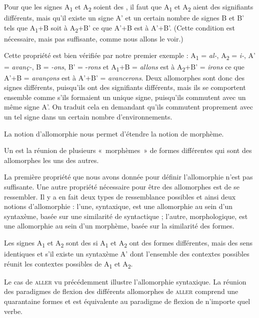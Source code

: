 {Pour que les signes A\textsubscript{1} et A\textsubscript{2} soient des , il faut que A\textsubscript{1} et A\textsubscript{2} aient des signifiants différents, mais qu’il existe un signe A’ et un certain nombre de signes B et B’ tels que A\textsubscript{1}+B soit à A\textsubscript{2}+B’ ce que A’+B est à A’+B’. (Cette condition est nécessaire, mais pas suffisante, comme nous allons le voir.)}

Cette propriété est bien vérifiée par notre premier exemple : A\textsubscript{1} = \textit{al-}, A\textsubscript{2} = \textit{i-}, A’ = \textit{avanç-}, B = \textit{{}-ons}, B’ = -\textit{rons} et A\textsubscript{1}+B = \textit{allons} est à A\textsubscript{2}+B’ = \textit{irons} ce que A’+B = \textit{avançons} est à A’+B’ = \textit{avancerons}. Deux allomorphes sont donc des signes différents, puisqu’ils ont des signifiants différents, mais ils se comportent ensemble comme s’ils formaient un unique signe, puisqu’ils commutent avec un même signe A’. On traduit cela en demandant qu’ils commutent proprement avec un tel signe dans un certain nombre d’environnements.

La notion d’allomorphie nous permet d’étendre la notion de morphème.

{Un  est la réunion de plusieurs «~morphèmes~» de formes différentes qui sont des allomorphes les uns des autres.}

La première propriété que nous avons donnée pour définir l’allomorphie n’est pas suffisante. Une autre propriété nécessaire pour être des allomorphes est de se ressembler. Il y a en fait deux types de ressemblance possibles et ainsi deux notions d’allomorphie : l’une, syntaxique, est une allomorphie au sein d’un syntaxème, basée sur une similarité de syntactique ; l’autre, morphologique, est une allomorphie au sein d’un morphème, basée sur la similarité des formes.

{Les signes A\textsubscript{1} et A\textsubscript{2} sont des  si A\textsubscript{1} et A\textsubscript{2} ont des formes différentes, mais des sens identiques et s’il existe un syntaxème A’ dont l’ensemble des contextes possibles réunit les contextes possibles de A\textsubscript{1} et A\textsubscript{2}.}

Le cas de \textsc{aller} vu précédemment illustre l’allomorphie syntaxique. La réunion des paradigmes de flexion des différents allomorphes de \textsc{aller} comprend une quarantaine formes et est équivalente au paradigme de flexion de n’importe quel verbe.

